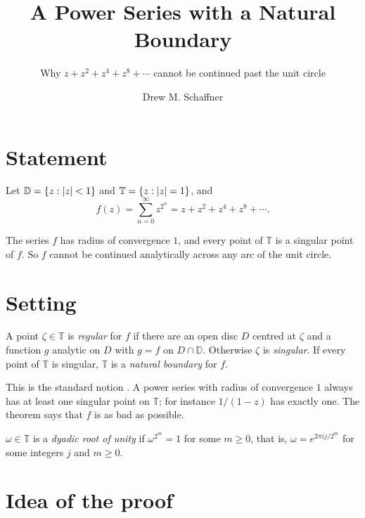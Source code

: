 \documentclass[11pt,a4paper]{article}
\title{A Power Series with a Natural Boundary}
\subtitle{Why $z + z^2 + z^4 + z^8 + \dotsb$ cannot be continued past the unit circle}
\author{Drew M. Schaffner}
\begin{document}
\maketitle

\section{Statement}

Let $\mathbb{D} = \{z : \lvert z\rvert < 1\}$ and $\mathbb{T} = \{z : \lvert z\rvert = 1\}$, and
\[
  f(z) = \sum_{n=0}^{\infty} z^{2^n} = z + z^2 + z^4 + z^8 + \dotsb .
\]

\begin{theorem}\label{thm:main}
  The series $f$ has radius of convergence $1$, and every point of $\mathbb{T}$ is a
  singular point of $f$. So $f$ cannot be continued analytically across any arc of
  the unit circle.
\end{theorem}

\section{Setting}

\begin{definition}\label{def:regular}
  A point $\zeta \in \mathbb{T}$ is \emph{regular} for $f$ if there are an open disc
  $D$ centred at $\zeta$ and a function $g$ analytic on $D$ with $g = f$ on
  $D \cap \mathbb{D}$. Otherwise $\zeta$ is \emph{singular}. If every point of
  $\mathbb{T}$ is singular, $\mathbb{T}$ is a \emph{natural boundary} for $f$.
\end{definition}

This is the standard notion \cite[ch.~16]{rudin-rca}. A power series with radius
of convergence $1$ always has at least one singular point on $\mathbb{T}$; for
instance $1/(1 - z)$ has exactly one. The theorem says that $f$ is as bad as
possible.

\begin{definition}\label{def:dyadic}
  $\omega \in \mathbb{T}$ is a \emph{dyadic root of unity} if $\omega^{2^m} = 1$ for
  some $m \geq 0$, that is, $\omega = e^{2\pi i j / 2^m}$ for some integers $j$ and
  $m \geq 0$.
\end{definition}

\section{Idea of the proof}
\end{document}
